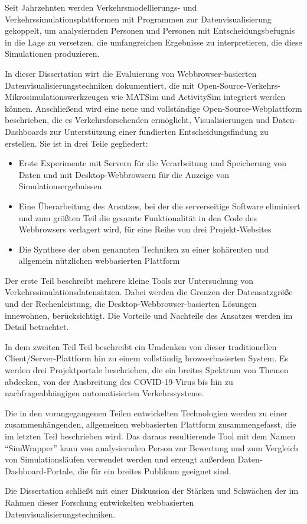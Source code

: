 Seit Jahrzehnten werden Verkehrsmodellierungs- und Verkehrssimulationsplattformen mit Programmen zur Datenvisualisierung gekoppelt, um analysiernden Personen und Personen mit Entscheidungsbefugnis in die Lage zu versetzen, die umfangreichen Ergebnisse zu interpretieren, die diese Simulationen produzieren.

In dieser Dissertation wirt die Evaluierung von Webbrowser-basierten Datenvisualisierungstechniken dokumentiert, die mit Open-Source-Verkehrs-Mikrosimulationswerkzeugen wie MATSim und ActivitySim integriert werden können. Anschließend wird eine neue und vollständige Open-Source-Webplattform beschrieben, die es Verkehrsforschenden ermöglicht, Visualisierungen und Daten-Dashboards zur Unterstützung einer fundierten Entscheidungsfindung zu erstellen. Sie ist in drei Teile gegliedert:

\begin{itemize}
	\item Erste Experimente mit Servern für die Verarbeitung und Speicherung von Daten und mit Desktop-Webbrowsern für die Anzeige von Simulationsergebnissen
	\item Eine Überarbeitung des Ansatzes, bei der die serverseitige Software eliminiert und zum größten Teil die gesamte Funktionalität in den Code des Webbrowsers verlagert wird, für eine Reihe von drei Projekt-Websites
	\item Die Synthese der oben genannten Techniken zu einer kohärenten und allgemein nützlichen webbasierten Plattform
\end{itemize}

Der erste Teil beschreibt mehrere kleine Tools zur Untersuchung von Verkehrssimulationsdatensätzen. Dabei werden die Grenzen der Datensatzgröße und der Rechenleistung, die Desktop-Webbrowser-basierten Lösungen innewohnen, berücksichtigt. Die Vorteile und Nachteile des Ansatzes werden im Detail betrachtet.

In dem zweiten Teil Teil beschreibt ein Umdenken von dieser traditionellen Client/Server-Plattform hin zu einem vollständig browserbasierten System. Es werden drei Projektportale beschrieben, die ein breites Spektrum von Themen abdecken, von der Ausbreitung des COVID-19-Virus bis hin zu nachfrageabhängigen automatisierten Verkehrssysteme.

Die in den vorangegangenen Teilen entwickelten Technologien werden zu einer zusammenhängenden, allgemeinen webbasierten Plattform zusammengefasst, die im letzten Teil beschrieben wird. Das daraus resultierende Tool mit dem Namen “SimWrapper” kann von analysiernden Person zur Bewertung und zum Vergleich von Simulationsläufen verwendet werden und erzeugt außerdem Daten-Dashboard-Portale, die für ein breites Publikum geeignet sind.

Die Dissertation schließt mit einer Diskussion der Stärken und Schwächen der im Rahmen dieser Forschung entwickelten webbasierten Datenvisualisierungstechniken.

